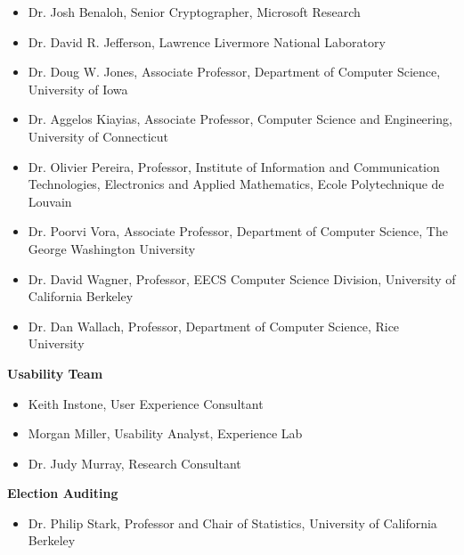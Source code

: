 \begin{itemize}

\item Dr. Josh Benaloh, Senior Cryptographer, Microsoft Research

\item Dr. David R. Jefferson, Lawrence Livermore National Laboratory
 
\item Dr. Doug W. Jones, Associate Professor, Department of Computer
  Science, University of Iowa
 
\item Dr. Aggelos Kiayias, Associate Professor, Computer Science and
  Engineering, University of Connecticut
 
\item Dr. Olivier Pereira, Professor, Institute of Information and
  Communication Technologies, Electronics and Applied Mathematics,
  Ecole Polytechnique de Louvain
 
\item Dr. Poorvi Vora, Associate Professor, Department of Computer
  Science, The George Washington University
 
\item Dr. David Wagner, Professor, EECS Computer Science Division,
  University of California Berkeley
 
\item Dr. Dan Wallach, Professor, Department of Computer Science, Rice
  University

\end{itemize}
 
\textbf{Usability Team}

\begin{itemize}

\item Keith Instone, User Experience Consultant

\item Morgan Miller, Usability Analyst, Experience Lab

\item Dr. Judy Murray, Research Consultant

\end{itemize}

\textbf{Election Auditing}

\begin{itemize}
\item Dr. Philip Stark, Professor and Chair of Statistics, University
  of California Berkeley
\end{itemize}

